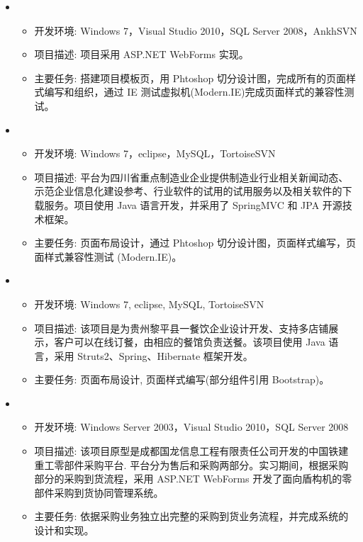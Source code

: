 \documentclass[letterpaper,11pt]{article}
\begin{document}
  \begin{itemize}[leftmargin=*]
    \item
      {\footnotesize
      \begin{itemize}
        \item 开发环境: Windows 7，Visual Studio 2010，SQL Server 2008，AnkhSVN
        \item 项目描述: 项目采用 ASP.NET WebForms 实现。
        \item 主要任务: 搭建项目模板页，用 Phtoshop 切分设计图，完成所有的页面样式编写和组织，通过 IE 测试虚拟机(Modern.IE)完成页面样式的兼容性测试。
      \end{itemize}
      }
    \item
      {\footnotesize
      \begin{itemize}
        \item 开发环境: Windows 7，eclipse，MySQL，TortoiseSVN
        \item 项目描述: 平台为四川省重点制造业企业提供制造业行业相关新闻动态、示范企业信息化建设参考、行业软件的试用的试用服务以及相关软件的下载服务。项目使用 Java 语言开发，并采用了 SpringMVC 和 JPA 开源技术框架。
        \item 主要任务: 页面布局设计，通过 Phtoshop 切分设计图，页面样式编写，页面样式兼容性测试 (Modern.IE)。
      \end{itemize}
      }
    \item
    {\footnotesize
    \begin{itemize}
      \item 开发环境: Windows 7, eclipse, MySQL, TortoiseSVN
      \item 项目描述: 该项目是为贵州黎平县一餐饮企业设计开发、支持多店铺展示，客户可以在线订餐，由相应的餐馆负责送餐。该项目使用 Java 语言，采用 Struts2、Spring、Hibernate 框架开发。
      \item 主要任务: 页面布局设计, 页面样式编写(部分组件引用 Bootstrap)。
    \end{itemize}
    }
    \item
    {\footnotesize
    \begin{itemize}
      \item 开发环境: Windows Server 2003，Visual Studio 2010，SQL Server 2008
      \item 项目描述: 该项目原型是成都国龙信息工程有限责任公司开发的中国铁建重工零部件采购平台. 平台分为售后和采购两部分。实习期间，根据采购部分的采购到货流程，采用 ASP.NET WebForms 开发了面向盾构机的零部件采购到货协同管理系统。
      \item 主要任务: 依据采购业务独立出完整的采购到货业务流程，并完成系统的设计和实现。
    \end{itemize}
    }
  \end{itemize}
\end{document}
